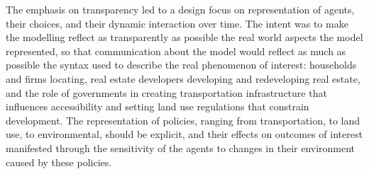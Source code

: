 The emphasis on transparency led to a design focus on
representation of agents, their choices, and their dynamic
interaction over time. The intent was to make the modelling
reflect as transparently as possible the real world aspects the
model represented, so that communication about the model would
reflect as much as possible the syntax used to describe the real
phenomenon of interest: households and firms locating, real estate
developers developing and redeveloping real estate, and the role
of governments in creating transportation infrastructure that
influences accessibility and setting land use regulations that
constrain development.  The representation of policies, ranging
from transportation, to land use, to environmental, should be
explicit, and their effects on outcomes of interest manifested
through the sensitivity of the agents to changes in their
environment caused by these policies.
